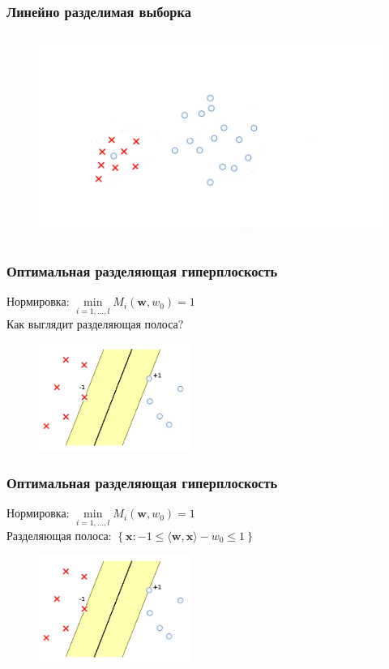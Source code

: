\documentclass[12pt]{beamer}
\begin{document}
\begin{frame}\frametitle{Линейно разделимая выборка}
\begin{figure}[htbp]
  \includegraphics[height=190pt, keepaspectratio = true]{images/linearly_unseparable}   
\end{figure}
\end{frame}

\begin{frame}\frametitle{Оптимальная разделяющая гиперплоскость}
Нормировка: $\min\limits_{i = 1, \dots , l} M_i(\mathbf{w}, w_0) = 1$\\
Как выглядит разделяющая полоса?
\begin{figure}[htbp]
  \includegraphics[height=100pt, keepaspectratio = true]{images/linearly_separable3}   
\end{figure}
\end{frame}


\begin{frame}\frametitle{Оптимальная разделяющая гиперплоскость}
Нормировка: $\min\limits_{i = 1, \dots , l} M_i(\mathbf{w}, w_0) = 1$\\
Разделяющая полоса: $\left\{\mathbf{x}: -1 \leq \langle \mathbf{w}, \mathbf{x}\rangle - w_0 \leq 1\right\}$
\begin{figure}[htbp]
  \includegraphics[height=100pt, keepaspectratio = true]{images/linearly_separable3}   
\end{figure}
\end{frame}
\end{document}

